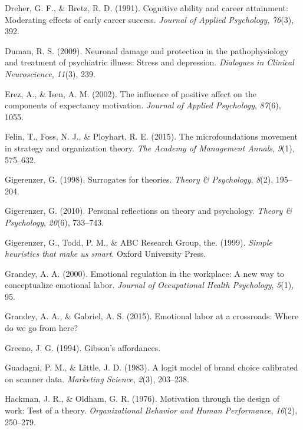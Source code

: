 \documentclass[english,,man]{apa6}
\theoremstyle{definition}
\theoremstyle{definition}
\theoremstyle{definition}
\theoremstyle{remark}
\begin{document}
\leavevmode\hypertarget{ref-dreher1991}{}%
Dreher, G. F., \& Bretz, R. D. (1991). Cognitive ability and career
attainment: Moderating effects of early career success. \emph{Journal of
Applied Psychology}, \emph{76}(3), 392.

\leavevmode\hypertarget{ref-duman2009}{}%
Duman, R. S. (2009). Neuronal damage and protection in the
pathophysiology and treatment of psychiatric illness: Stress and
depression. \emph{Dialogues in Clinical Neuroscience}, \emph{11}(3),
239.

\leavevmode\hypertarget{ref-erez2002}{}%
Erez, A., \& Isen, A. M. (2002). The influence of positive affect on the
components of expectancy motivation. \emph{Journal of Applied
Psychology}, \emph{87}(6), 1055.

\leavevmode\hypertarget{ref-felin2015}{}%
Felin, T., Foss, N. J., \& Ployhart, R. E. (2015). The microfoundations
movement in strategy and organization theory. \emph{The Academy of
Management Annals}, \emph{9}(1), 575--632.

\leavevmode\hypertarget{ref-gigerenzer1998}{}%
Gigerenzer, G. (1998). Surrogates for theories. \emph{Theory \&
Psychology}, \emph{8}(2), 195--204.

\leavevmode\hypertarget{ref-gigerenzer2010}{}%
Gigerenzer, G. (2010). Personal reflections on theory and psychology.
\emph{Theory \& Psychology}, \emph{20}(6), 733--743.

\leavevmode\hypertarget{ref-gigerenzer1999}{}%
Gigerenzer, G., Todd, P. M., \& ABC Research Group, the. (1999).
\emph{Simple heuristics that make us smart}. Oxford University Press.

\leavevmode\hypertarget{ref-grandey2000}{}%
Grandey, A. A. (2000). Emotional regulation in the workplace: A new way
to conceptualize emotional labor. \emph{Journal of Occupational Health
Psychology}, \emph{5}(1), 95.

\leavevmode\hypertarget{ref-grandey2015}{}%
Grandey, A. A., \& Gabriel, A. S. (2015). Emotional labor at a
crossroads: Where do we go from here?

\leavevmode\hypertarget{ref-greeno1994}{}%
Greeno, J. G. (1994). Gibson's affordances.

\leavevmode\hypertarget{ref-guadagni1983}{}%
Guadagni, P. M., \& Little, J. D. (1983). A logit model of brand choice
calibrated on scanner data. \emph{Marketing Science}, \emph{2}(3),
203--238.

\leavevmode\hypertarget{ref-hackman1976}{}%
Hackman, J. R., \& Oldham, G. R. (1976). Motivation through the design
of work: Test of a theory. \emph{Organizational Behavior and Human
Performance}, \emph{16}(2), 250--279.
\end{document}
